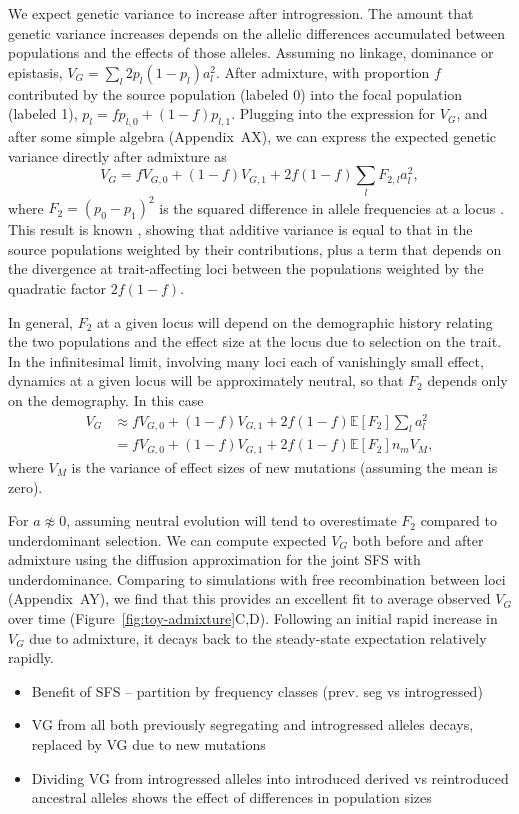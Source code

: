 \documentclass{article}
\begin{document}
We expect genetic variance to increase after introgression. The amount that
genetic variance increases depends on the allelic differences accumulated
between populations and the effects of those alleles. Assuming no linkage,
dominance or epistasis, \(V_G=\sum_l 2p_l(1-p_l)a_l^2\). After admixture, with
proportion $f$ contributed by the source population (labeled 0) into the focal
population (labeled 1), \(p_l = fp_{l,0} + (1-f)p_{l,1}\). Plugging into the
expression for $V_G$, and after some simple algebra (Appendix~AX), we can
express the expected genetic variance directly after admixture as \[V_G =
fV_{G,0} + (1-f) V_{G,1} + 2f(1-f)\sum_l F_{2,l} a_l^2,\] where $F_2 = (p_0 -
p_1)^2$ is the squared difference in allele frequencies at a locus
\citep[e.g.,][]{peter2016admixture}. This result is known
\citep[e.g.,][]{tufto2000quantitative}, showing that additive variance is equal
to that in the source populations weighted by their contributions, plus a term
that depends on the divergence at trait-affecting loci between the populations
weighted by the quadratic factor $2f(1-f)$.

In general, $F_2$ at a given locus will depend on the demographic history
relating the two populations and the effect size at the locus due to selection
on the trait. In the infinitesimal limit, involving many loci each of
vanishingly small effect, dynamics at a given locus will be approximately
neutral, so that $F_2$ depends only on the demography. In this case
\begin{align*}
    V_G & \approx f V_{G,0} + (1-f) V_{G,1} + 2f(1-f)\mathbb{E}[F_2] \sum_l a_l^2 \\
    & = f V_{G,0} + (1-f) V_{G,1} + 2f(1-f)\mathbb{E}[F_2] n_m V_M,
\end{align*}
where $V_M$ is the variance of effect sizes of new mutations (assuming the mean
is zero). 

For $a \not\approx 0$, assuming neutral evolution will tend to overestimate
$F_2$ compared to underdominant selection. We can compute expected $V_G$ both
before and after admixture using the diffusion approximation for the joint SFS
with underdominance. Comparing to simulations with free recombination between
loci (Appendix~AY), we find that this provides an excellent fit to average
observed $V_G$ over time (Figure~\ref{fig:toy-admixture}C,D). Following an
initial rapid increase in $V_G$ due to admixture, it decays back to the
steady-state expectation relatively rapidly.

\begin{itemize}
    \item Benefit of SFS -- partition by frequency classes (prev. seg vs introgressed)
    \item VG from all both previously segregating and introgressed alleles decays,
        replaced by VG due to new mutations
    \item Dividing VG from introgressed alleles into introduced derived vs reintroduced
        ancestral alleles shows the effect of differences in population sizes
\end{itemize}
\end{document}
